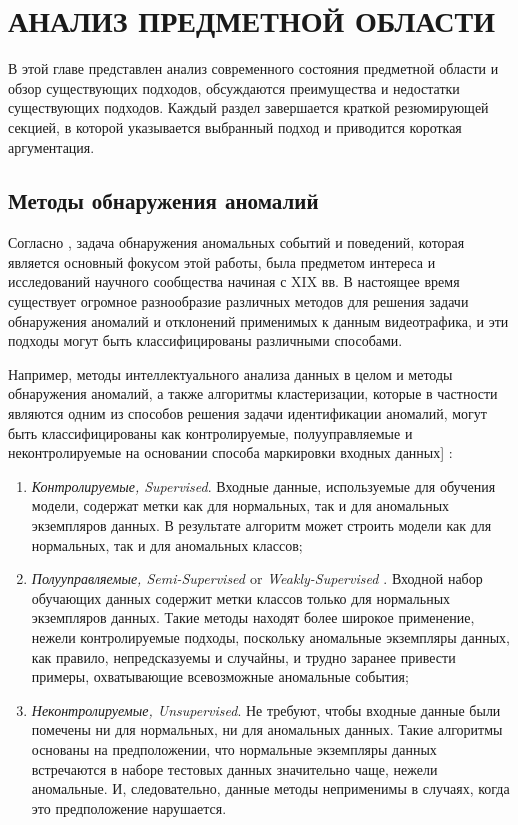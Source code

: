 \chapter{АНАЛИЗ ПРЕДМЕТНОЙ ОБЛАСТИ}
\label{ch:АНАЛИЗ ПРЕДМЕТНОЙ ОБЛАСТИ}

В этой главе представлен анализ современного состояния предметной области и обзор существующих подходов, обсуждаются преимущества и недостатки существующих подходов. Каждый раздел завершается краткой резюмирующей секцией, в которой указывается выбранный подход и приводится короткая аргументация.

\section{Методы обнаружения аномалий}

Согласно \cite{article:15_survey_ad}, задача обнаружения аномальных событий и поведений, которая является основный фокусом этой работы, была предметом интереса и исследований научного сообщества начиная с XIX вв. В настоящее время существует огромное разнообразие различных методов для решения задачи обнаружения аномалий и отклонений применимых к данным видеотрафика, и эти подходы могут быть классифицированы различными способами.

Например, методы интеллектуального анализа данных в целом и методы обнаружения аномалий, а также алгоритмы кластеризации, которые в частности являются одним из способов решения задачи идентификации аномалий, могут быть классифицированы как контролируемые, полууправляемые и неконтролируемые на основании способа маркировки входных данных] \cite{article:15_survey_ad} \cite{article:comp_analys_odt}:

\begin{enumerate}
	\item \textit{Контролируемые, Supervised}. Входные данные, используемые для обучения модели, содержат метки как для нормальных, так и для аномальных экземпляров данных. В результате алгоритм может строить модели как для нормальных, так и для аномальных классов;

	\item \textit{Полууправляемые, Semi-Supervised \cite{article:15_survey_ad}} or \textit{Weakly-Supervised \cite{article:5_survey_tbsa}}. Входной набор обучающих данных содержит метки классов только для нормальных экземпляров данных. Такие методы находят более широкое применение, нежели контролируемые подходы, поскольку аномальные экземпляры данных, как правило, непредсказуемы и случайны, и трудно заранее привести примеры, охватывающие всевозможные аномальные события;

	\item \textit{Неконтролируемые, Unsupervised}. Не требуют, чтобы входные данные были помечены ни для нормальных, ни для аномальных данных. Такие алгоритмы основаны на предположении, что нормальные экземпляры данных встречаются в наборе тестовых данных значительно чаще, нежели аномальные. И, следовательно, данные методы неприменимы в случаях, когда это предположение нарушается.

\end{enumerate}

